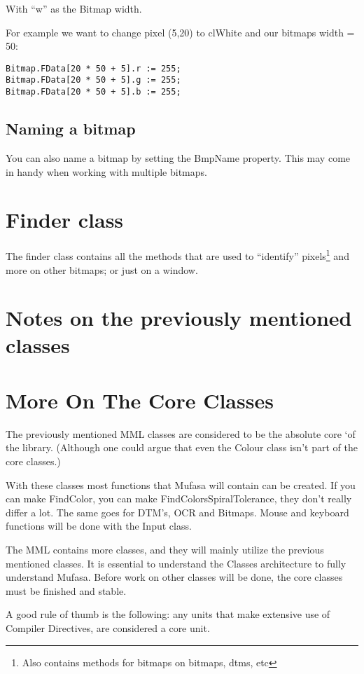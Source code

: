\documentclass[a4paper, 10pt]{report} %
\begin{document}
With ``w'' as the Bitmap width.

For example we want to change pixel (5,20) to clWhite and our bitmaps
width = 50:
\begin{verbatim}
Bitmap.FData[20 * 50 + 5].r := 255;
Bitmap.FData[20 * 50 + 5].g := 255;
Bitmap.FData[20 * 50 + 5].b := 255;
\end{verbatim}

\subsection{Naming a bitmap}
You can also name a bitmap by setting the BmpName property.
This may come in handy when working with multiple bitmaps.

\section{Finder class}
The finder class contains all the methods that are used to ``identify''
pixels\footnote{Also contains methods for bitmaps on bitmaps, dtms, etc} 
and more on other bitmaps; or just on a window.

\section{Notes on the previously mentioned classes}


\section{More On The Core Classes}

The previously mentioned MML classes are considered to be the absolute core 
`of the library. (Although one could argue that even the Colour class isn't
part of the core classes.)

With these classes most functions that Mufasa will contain can be created.
If you can make FindColor, you can make FindColorsSpiralTolerance, 
they don't really differ a lot. The same goes for DTM's, OCR and Bitmaps.
Mouse and keyboard functions will be done with the Input class.

The MML contains more classes, and they will mainly utilize the previous
mentioned classes. It is essential to understand the Classes architecture
to fully understand Mufasa. Before work on other classes will be done,
the core classes must be finished and stable.

A good rule of thumb is the following: any units that make extensive use of
Compiler Directives, are considered a core unit.
\end{document}

